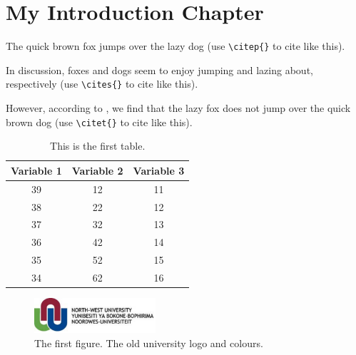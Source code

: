 \chapter[Introduction]{My Introduction Chapter}


The quick brown fox jumps over the lazy dog \citep{sippsetal1985}
(use \verb!\citep{}! to cite like this).

In \cites{murray1990review} discussion, foxes and dogs seem to enjoy jumping and lazing about, respectively
(use \verb!\cites{}! to cite like this).

However, according to \citet{murray1990review}, we find that the lazy fox does not jump over the quick brown dog
(use \verb!\citet{}! to cite like this).


\begin{table}[!htbp!]%
\caption{This is the first table.}
\label{tabl:1}
\centering
\small
\begin{tabular}{ccc}
\hline
Variable 1 & Variable 2 & Variable 3 \\ 
\hline
39 & 12 & 11\\
38 & 22 & 12\\
37 & 32 & 13\\
36 & 42 & 14\\
35 & 52 & 15\\
34 & 62 & 16\\
\hline
\end{tabular}
\end{table}

\begin{figure}[!htbp!]%
\centering
\includegraphics[width=0.4\textwidth]{img/NWU}%
\caption{The first figure. The old university logo and colours.}%
\label{fig:1}%
\end{figure}

